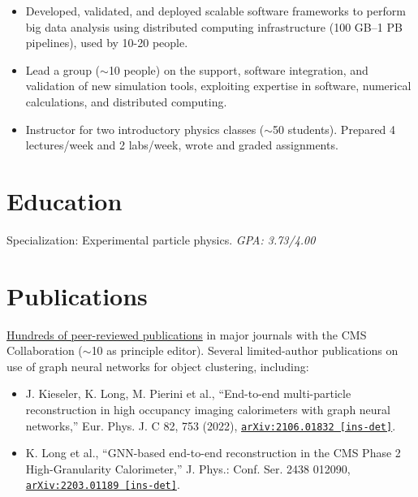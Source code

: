 \documentclass[9pt,a4paper]{moderncv}
\begin{document}
{
\begin{itemize}
    \item Developed, validated, and deployed scalable software frameworks to perform big data analysis using
distributed computing infrastructure (100 GB--1 PB pipelines), used by 10-20 people.
    \item Lead a group ($\sim$10 people) on the support, software integration, and validation of new simulation tools, exploiting expertise in software, numerical calculations, and distributed computing.
    \item Instructor for two introductory physics classes ($\sim$50 students). Prepared 4 lectures/week and 2 labs/week, wrote and graded assignments.
\end{itemize}
}
\section{Education}
{
    Specialization: Experimental particle physics.
    \normalsize \textit{GPA: 3.73/4.00} 
}

\section{Publications}
\href{https://inspirehep.net/authors/1280606}{Hundreds of peer-reviewed publications} in major journals with the CMS Collaboration ($\sim$10 as principle editor). Several limited-author publications on use of graph neural networks for object clustering, including:
\begin{itemize}
    \item J. Kieseler, K. Long, M. Pierini et al., ``End-to-end multi-particle reconstruction in high occupancy imaging calorimeters with graph neural networks,'' Eur. Phys. J. C 82, 753 (2022), \href{https://arxiv.org/abs/2106.01832}{\texttt{arXiv:2106.01832 [ins-det]}}.
    \item K. Long et al., ``GNN-based end-to-end reconstruction in the CMS Phase 2 High-Granularity Calorimeter,'' J. Phys.: Conf. Ser. 2438 012090, \href{https://arxiv.org/abs/2203.01189 }{\texttt{arXiv:2203.01189 [ins-det]}}.
\end{itemize}
\end{document}

